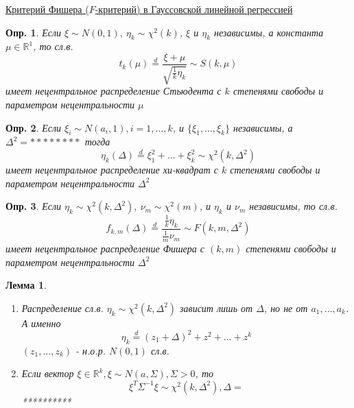 \documentclass[12pt]{article}
\newtheorem{definition}{Опр.}
\newtheorem{lemma}{Лемма}
\theoremstyle{basic_theorem}
\theoremstyle{name_theorem}
\def\R{
    \mathbb{R}
}
\begin{document}
    \underline{Критерий Фишера ($F$-критерий) в Гауссовской линейной регрессией}
\begin{definition}
        Если $\xi\sim N(0,1),\ \eta_k\sim\chi^2(k)$, $\xi$ и $\eta_k$
        независимы, а константа $\mu\in\R^1$, то сл.в.
        $$t_k(\mu)\overset{d}{=}\frac{\xi+\mu}{\sqrt{\frac{1}{k}\eta_k}}\sim S(k,\mu)$$
        имеет нецентральное распределение Стьюдента с $k$ степенями свободы
        и параметром нецентральности $\mu$
\end{definition}
\begin{definition}
    Если $\xi_i\sim N(a_i,1),i=1,\ldots,k$, и $\{\xi_1,\ldots,\xi_k\}$
    независимы, а $\Delta^2=********$ тогда
    $$\eta_k(\Delta)\overset{d}{=}\xi_1^2+\ldots+\xi_k^2\sim\chi^2(k,\Delta^2)$$
    имеет нецентральное распределение хи-квадрат с $k$ степенями свободы
    и параметром нецентральности $\Delta^2$
\end{definition}
\begin{definition}
    Если $\eta_k\sim\chi^2(k,\Delta^2),\ \nu_m\sim\chi^2(m)$, и $\eta_k$ и $\nu_m$
    независимы, то сл.в.
    $$f_{k,m}(\Delta)\overset{d}{=}\frac{\frac{1}{k}\eta_k}{\frac{1}{m}\nu_m}\sim F(k,m,\Delta^2)$$
    имеет нецентральное распределение Фишера с $(k,m)$ степенями свободы и параметром
    нецентральности $\Delta^2$
\end{definition}
\begin{lemma}
    \begin{enumerate}
        \item Распределение сл.в. $\eta_k\sim\chi^2(k,\Delta^2)$ зависит лишь
            от $\Delta$, но не от $a_1,\ldots,a_k$. А именно
            $$\eta_k\overset{d}{=}(z_1+\Delta)^2+z^2+\ldots+z^k$$
            $(z_1,\ldots,z_k)$ - н.о.р. $N(0,1)$ сл.в.
        \item Если вектор $\xi\in\R^k,\xi\sim N(a, \Sigma),\Sigma>0$, то
        $$\xi^T\Sigma^{-1}\xi\sim\chi^2(k,\Delta^2),\Delta=$$ 
        **********
    \end{enumerate}
\end{lemma}
\end{document}
